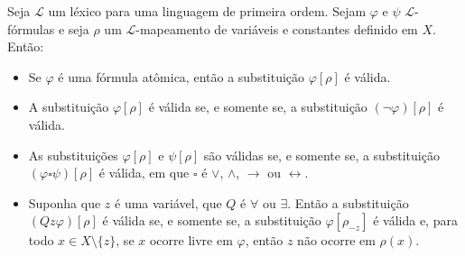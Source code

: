 \begin{metalemma}\label{mlem:criteriosSubstituibilidade}
    Seja $\mathcal L$ um léxico para uma linguagem de primeira ordem.
    Sejam $\varphi$ e $\psi$ $\mathcal L$-fórmulas e seja $\rho$ um $\mathcal L$-mapeamento de variáveis e constantes definido em $X$.
    Então:
    \begin{itemize}
        \item Se $\varphi$ é uma fórmula atômica, então a substituição $\varphi[\rho]$ é válida.
        \item A substituição $\varphi[\rho]$ é válida se, e somente se, a substituição $(\neg \varphi)[\rho]$ é válida.
        \item As substituições $\varphi[\rho]$ e $\psi[\rho]$ são válidas se, e somente se, a substituição $(\varphi\square\psi)[\rho]$ é válida, em que $\square$ é $\vee$, $\wedge$, $\rightarrow$ ou $\leftrightarrow$.
        \item Suponha que $z$ é uma variável, que $Q$ é $\forall$ ou $\exists$.
        Então a substituição $(Qz\varphi)[\rho]$ é válida se, e somente se, a substituição $\varphi[\rho_{-z}]$ é válida e, para todo $x\in X\setminus\{z\}$, se $x$ ocorre livre em $\varphi$, então $z$ não ocorre em $\rho(x)$.
    \end{itemize}
\end{metalemma}
